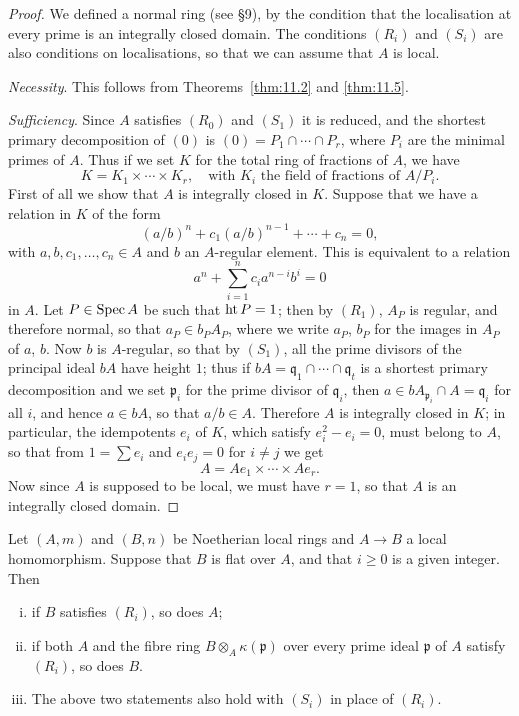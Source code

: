 \begin{proof}
We defined a normal ring (see \S9), by the condition that the localisation at
every prime is an integrally closed domain. The conditions $(R_i)$ and $(S_i)$ are
also conditions on localisations, so that we can assume that $A$ is local.

\textit{Necessity}. This follows from Theorems~\ref{thm:11.2} and \ref{thm:11.5}.

\textit{Sufficiency}. Since $A$ satisfies $(R_0)$ and $(S_1)$ it is reduced, and the
shortest primary decomposition of $(0)$ is $(0) = P_1 \cap \cdots \cap P_r$, where $P_i$
are the minimal primes of $A$. Thus if we set $K$ for the total ring of fractions
of $A$, we have
\[
  K = K_1 \times \cdots \times K_r, \quad \text{with } K_i \text{ the field of fractions of } A/P_i.
\]
First of all we show that $A$ is integrally closed in $K$. Suppose that we have a
relation in $K$ of the form
\[
  (a/b)^n + c_1(a/b)^{n-1} + \cdots + c_n = 0,
\]
with $a, b, c_1, \ldots, c_n \in A$ and $b$ an $A$-regular element. This is equivalent to
a relation
\[
  a^n + \sum_{i=1}^n c_i a^{n-i}b^i = 0
\]
in $A$. Let $P \in \operatorname{Spec} A$ be such that $\operatorname{ht} P = 1$; then by $(R_1)$, $A_P$ is regular,
and therefore normal, so that $a_P \in b_P A_P$, where we write $a_P$, $b_P$ for the
images in $A_P$ of $a$, $b$. Now $b$ is $A$-regular, so that by $(S_1)$, all the prime
divisors of the principal ideal $bA$ have height $1$; thus if
$bA = \mathfrak{q}_1 \cap \cdots \cap \mathfrak{q}_t$ is a shortest primary decomposition and we set
$\mathfrak{p}_i$ for the prime divisor of $\mathfrak{q}_i$, then $a \in bA_{\mathfrak{p}_i} \cap A = \mathfrak{q}_i$ for all
$i$, and hence $a \in bA$, so that $a/b \in A$. Therefore $A$ is integrally closed in
$K$; in particular, the idempotents $e_i$ of $K$, which satisfy $e_i^2 - e_i = 0$, must
belong to $A$, so that from $1 = \sum e_i$ and $e_ie_j = 0$ for $i \neq j$ we get
\[
  A = Ae_1 \times \cdots \times Ae_r.
\]
Now since $A$ is supposed to be local, we must have $r = 1$, so that $A$ is an
integrally closed domain.
\end{proof}

\begin{theorem}\label{thm:23.9}
Let $(A, m)$ and $(B, n)$ be Noetherian local rings and $A \to B$ a local
homomorphism. Suppose that $B$ is flat over $A$, and that $i \ge 0$ is a given
integer. Then
\begin{enumerate}[(i)]
  \item if $B$ satisfies $(R_i)$, so does $A$;
  \item if both $A$ and the fibre ring $B \otimes_A \kappa(\mathfrak{p})$ over every prime ideal
        $\mathfrak{p}$ of $A$ satisfy $(R_i)$, so does $B$.
  \item The above two statements also hold with $(S_i)$ in place of $(R_i)$.
\end{enumerate}
\end{theorem}

